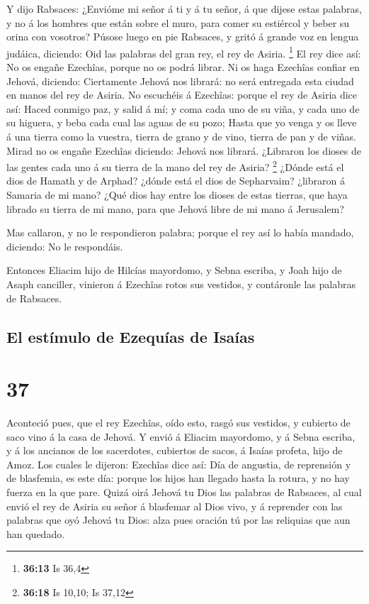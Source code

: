  Y dijo Rabsaces: ¿Envióme mi señor á ti y á tu señor, á
que dijese estas palabras, y no á los hombres que están sobre el muro,
para comer su estiércol y beber su orina con vosotros? 
Púsose luego en pie Rabsaces, y gritó á grande voz en lengua judáica,
diciendo: Oid las palabras del gran rey, el rey de Asiria. \footnote{\textbf{36:13}
  Is 36,4}  El rey dice así: No os engañe Ezechîas,
porque no os podrá librar.  Ni os haga Ezechîas confiar
en Jehová, diciendo: Ciertamente Jehová nos librará: no será entregada
esta ciudad en manos del rey de Asiria.  No escuchéis á
Ezechîas: porque el rey de Asiria dice así: Haced conmigo paz, y salid á
mí; y coma cada uno de su viña, y cada uno de su higuera, y beba cada
cual las aguas de su pozo;  Hasta que yo venga y os lleve
á una tierra como la vuestra, tierra de grano y de vino, tierra de pan y
de viñas.  Mirad no os engañe Ezechîas diciendo: Jehová
nos librará. ¿Libraron los dioses de las gentes cada uno á su tierra de
la mano del rey de Asiria? \footnote{\textbf{36:18} Is 10,10; Is 37,12}
 ¿Dónde está el dios de Hamath y de Arphad? ¿dónde está
el dios de Sepharvaim? ¿libraron á Samaria de mi mano? 
¿Qué dios hay entre los dioses de estas tierras, que haya librado su
tierra de mi mano, para que Jehová libre de mi mano á Jerusalem?

 Mas callaron, y no le respondieron palabra; porque el
rey así lo había mandado, diciendo: No le respondáis.

 Entonces Eliacim hijo de Hilcías mayordomo, y Sebna
escriba, y Joah hijo de Asaph canciller, vinieron á Ezechîas rotos sus
vestidos, y contáronle las palabras de Rabsaces.

\hypertarget{el-estuxedmulo-de-ezequuxedas-de-isauxedas}{%
\subsection{El estímulo de Ezequías de
Isaías}\label{el-estuxedmulo-de-ezequuxedas-de-isauxedas}}

\hypertarget{section-36}{%
\section{37}\label{section-36}}

 Aconteció pues, que el rey Ezechîas, oído esto, rasgó sus
vestidos, y cubierto de saco vino á la casa de Jehová.  Y
envió á Eliacim mayordomo, y á Sebna escriba, y á los ancianos de los
sacerdotes, cubiertos de sacos, á Isaías profeta, hijo de Amoz.
 Los cuales le dijeron: Ezechîas dice así: Día de
angustia, de reprensión y de blasfemia, es este día: porque los hijos
han llegado hasta la rotura, y no hay fuerza en la que pare.
 Quizá oirá Jehová tu Dios las palabras de Rabsaces, al
cual envió el rey de Asiria su señor á blasfemar al Dios vivo, y á
reprender con las palabras que oyó Jehová tu Dios: alza pues oración tú
por las reliquias que aun han quedado.

